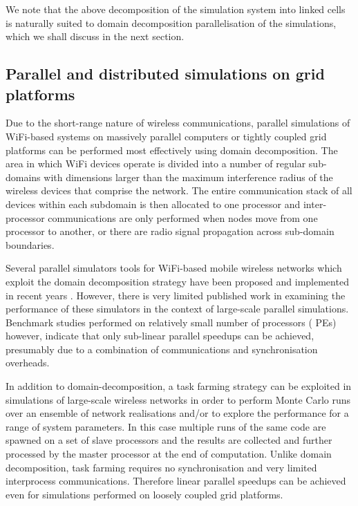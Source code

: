\documentclass{elsart}
\begin{document}
We note that the above  decomposition of the simulation system into linked cells is naturally suited to domain decomposition parallelisation of the simulations, 
which we shall discuss in the next section. 

\subsection{Parallel and distributed simulations on grid platforms}
Due to the short-range nature of  wireless communications, parallel 
simulations of WiFi-based systems on massively parallel computers or 
tightly coupled grid platforms can be performed most effectively 
using domain decomposition. The area in which WiFi devices operate is 
divided into a number of regular sub-domains with dimensions larger than the 
maximum interference radius of the wireless devices that comprise the 
network. The entire communication stack of all devices within
each subdomain is then allocated to one processor and inter-processor 
communications are only performed when nodes move from one processor to 
another, or there are radio signal propagation across sub-domain 
boundaries. 

Several parallel simulators tools for WiFi-based mobile wireless networks 
which exploit the domain decomposition strategy have been proposed and 
implemented in recent years \cite{glomo,qualnet,vanet,conserve1}. However,
there is very limited published work in examining the 
performance of these simulators in the context of 
large-scale parallel simulations.
Benchmark studies  performed on relatively small  number of processors ( 
PEs) however, indicate that only sub-linear parallel speedups can be achieved,
presumably due to a combination of communications and synchronisation overheads.

In addition to domain-decomposition, a task farming strategy can be exploited 
in simulations of large-scale wireless networks in 
order to perform Monte Carlo runs over an ensemble of  network realisations 
and/or to explore the performance for a range of system parameters.
In this case multiple runs of the same code are spawned 
on a set of slave  processors and the results are collected and further processed by the master processor at the end of computation. Unlike domain decomposition, task farming requires no synchronisation and very limited interprocess 
communications. Therefore linear parallel speedups can be achieved 
even for simulations performed on loosely coupled grid platforms.
\end{document}
